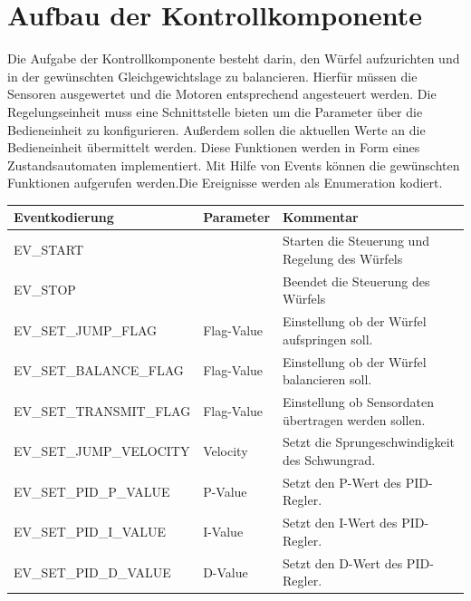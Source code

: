\documentclass{article}
\begin{document}
\newpage
\section{Aufbau der Kontrollkomponente}
Die Aufgabe der Kontrollkomponente besteht darin, den Würfel aufzurichten und in der gewünschten Gleichgewichtslage zu balancieren. Hierfür müssen die Sensoren ausgewertet und die Motoren entsprechend angesteuert werden. Die Regelungseinheit muss eine Schnittstelle bieten um die Parameter über die Bedieneinheit zu konfigurieren. Außerdem sollen die aktuellen Werte an die Bedieneinheit übermittelt werden.
Diese Funktionen werden in Form eines Zustandsautomaten implementiert. Mit Hilfe von Events können die gewünschten Funktionen aufgerufen werden.Die Ereignisse werden als Enumeration kodiert.

\begin{table}[h]
\centering
\begin{tabular}{|>{\small}l|>{\small}l|>{\small}l|}
\hline
\textbf{Eventkodierung}        & \textbf{Parameter} & \textbf{Kommentar}                                       \\ \hline
EV\_START                      &                    & Starten die Steuerung und Regelung des Würfels           \\ \hline
EV\_STOP                       &                    & Beendet die Steuerung des Würfels                        \\ \hline
EV\_SET\_JUMP\_FLAG            & Flag-Value         & Einstellung ob der Würfel aufspringen soll.              \\ \hline
EV\_SET\_BALANCE\_FLAG         & Flag-Value         & Einstellung ob der Würfel balancieren soll.              \\ \hline
EV\_SET\_TRANSMIT\_FLAG        & Flag-Value         & Einstellung ob Sensordaten übertragen werden sollen.     \\ \hline
EV\_SET\_JUMP\_VELOCITY        & Velocity       & Setzt die Sprungeschwindigkeit des Schwungrad.           \\ \hline
EV\_SET\_PID\_P\_VALUE         & P-Value            & Setzt den P-Wert des PID-Regler.                         \\ \hline
EV\_SET\_PID\_I\_VALUE         & I-Value            & Setzt den I-Wert des PID-Regler.                         \\ \hline
EV\_SET\_PID\_D\_VALUE         & D-Value            & Setzt den D-Wert des PID-Regler.                         \\ \hline

\end{tabular}
\end{table}
\end{document}
